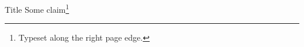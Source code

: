 
\sidefootnotes
\begin{standardframe}{Title}
	Some claim\footnote{Typeset along the right page edge.}
\end{standardframe}